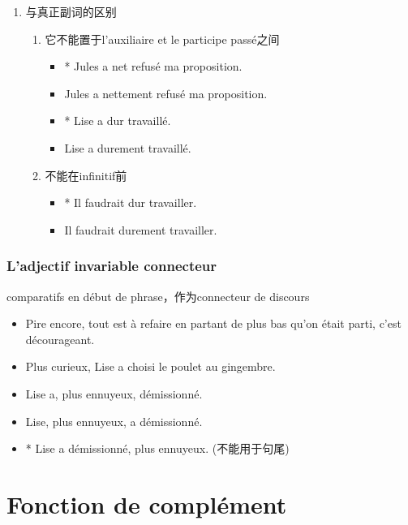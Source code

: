 \documentclass[UTF8]{report}
\begin{document}
\begin{enumerate}
    \item 与真正副词的区别
    \begin{enumerate}
        \item 它不能置于l’auxiliaire et le participe passé之间
        \begin{itemize}
            \item * Jules a net refusé ma proposition.
            \item Jules a nettement refusé ma proposition.
            \item * Lise a dur travaillé.
            \item Lise a durement travaillé.
        \end{itemize}
        \item 不能在infinitif前
        \begin{itemize}
            \item * Il faudrait dur travailler.
            \item Il faudrait durement travailler.
        \end{itemize}
    \end{enumerate}
\end{enumerate}

\subsubsection{L’adjectif invariable connecteur}
comparatifs en début de phrase，作为connecteur de discours
\begin{itemize}
    \item Pire encore, tout est à refaire en partant de plus bas qu’on était parti, c’est décourageant.
    \item Plus curieux, Lise a choisi le poulet au gingembre.
    \item Lise a, plus ennuyeux, démissionné.
    \item Lise, plus ennuyeux, a démissionné.
    \item * Lise a démissionné, plus ennuyeux. (不能用于句尾)
\end{itemize}


\section{Fonction de complément}
\end{document}
